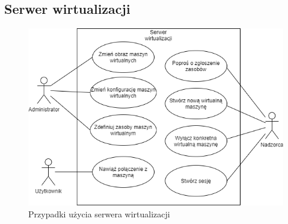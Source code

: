 \documentclass[../wstep.tex]{subfiles}
\begin{document}
\subsection{Serwer wirtualizacji}

\begin{figure}[H]
    \centering
    \includegraphics[width=\textwidth]{../diagrams/use_cases/virtualisation_server.png}
    \caption{Przypadki użycia serwera wirtualizacji}
\end{figure}
\end{document}

